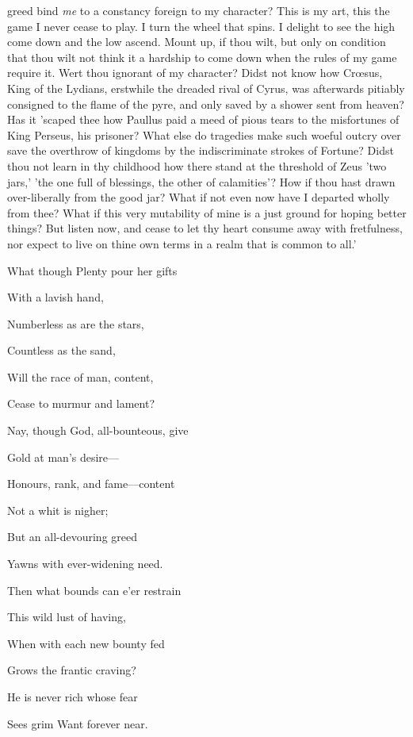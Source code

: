 greed bind \emph{me} to a constancy foreign to my character? This is my art,
this the game I never cease to play. I turn the wheel that spins. I
delight to see the high come down and the low ascend. Mount up, if thou
wilt, but only on condition that thou wilt not think it a hardship to
come down when the rules of my game require it. Wert thou ignorant of my
character? Didst not know how Crœsus, King of the Lydians, erstwhile
the dreaded rival of Cyrus, was afterwards pitiably consigned to the
flame of the pyre, and only saved by a shower sent from heaven? Has it
'scaped thee how Paullus paid a meed of pious tears to the misfortunes
of King Perseus, his prisoner? What else do tragedies make such woeful
outcry over save the overthrow of kingdoms by the indiscriminate strokes
of Fortune? Didst thou not learn in thy childhood how there stand at the
threshold of Zeus 'two jars,' 'the one full of blessings, the other of
calamities'? How if thou hast drawn over-liberally from the good jar?
What if not even now have I departed wholly from thee? What if this very
mutability of mine is a just ground for hoping better things? But listen
now, and cease to let thy heart consume away with fretfulness, nor
expect to live on thine own terms in a realm that is common to all.'


What though Plenty pour her gifts

With a lavish hand,

Numberless as are the stars,

Countless as the sand,

Will the race of man, content,

Cease to murmur and lament?

Nay, though God, all-bounteous, give

Gold at man's desire—

Honours, rank, and fame—content

Not a whit is nigher;

But an all-devouring greed

Yawns with ever-widening need.

Then what bounds can e'er restrain

This wild lust of having,

When with each new bounty fed

Grows the frantic craving?

He is never rich whose fear

Sees grim Want forever near.

